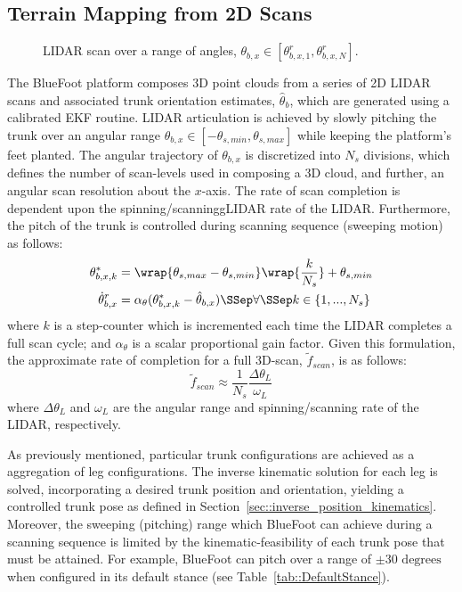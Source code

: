 		\subsection{Terrain Mapping from 2D Scans}
			\label{ssec::terrain_mapping}
			\begin{figure}[!h]
				\centering
				\caption{LIDAR scan over a range of angles, $\theta_{b,x} \in [\theta_{b,x,1}^{r},\theta_{b,x,N}^{r}]$. }
				\label{fig::sensor_sweep}
			\end{figure}
			The BlueFoot platform composes 3D point clouds from a series of 2D LIDAR scans and associated trunk orientation estimates, $\hat{\theta}_{b}$, which are generated using a calibrated EKF routine. LIDAR articulation is achieved by slowly pitching the trunk over an angular range $\theta_{b,x}\in[-\theta_{s,min},\theta_{s,max}]$ while keeping the platform's feet planted. The angular trajectory of $\theta_{b,x}$ is discretized into $N_{s}$ divisions, which defines the number of scan-levels used in composing a 3D cloud, and further, an angular scan resolution about the $x$-axis. The rate of scan completion is dependent upon the spinning/scanninggLIDAR rate of the LIDAR. Furthermore, the pitch of the trunk is controlled during scanning sequence (sweeping motion) as follows:
				\begin{equation}
					\begin{split}
					\theta_{b,x,k}^{*} &= 
						\wrap{\theta_{s,max}-\theta_{s,min}}
							\wrap{\frac{k}{N_{s}}} + 
								\theta_{s,min} \\
					\dot{\theta}_{b,x}^{r} &=
						\alpha_{\theta}
							(\theta_{b,x,k}^{*} - \hat{\theta}_{b,x} ) \SSep
							\forall \SSep k \in \{1,...,N_{s}\}
					\end{split}
				\end{equation}
			where $k$ is a step-counter which is incremented each time the LIDAR completes a full scan cycle; and $\alpha_{\theta}$ is a scalar proportional gain factor. Given this formulation, the approximate rate of completion for a full 3D-scan, $\tilde{f}_{scan}$, is as follows:
				\begin{equation}
					\tilde{f}_{scan}\approx\frac{1}{N_{s}}\frac{\Delta\theta_{L}}{\omega_{L}}
					\label{eq::point_cloud_collection_rate}
				\end{equation}
			where $\Delta\theta_{L}$ and $\omega_{L}$ are the angular range and spinning/scanning rate of the LIDAR, respectively.

			As previously mentioned, particular trunk configurations are achieved as a aggregation of leg configurations. The inverse kinematic solution for each leg is solved, incorporating a desired trunk position and orientation, yielding a controlled trunk pose as defined in Section~\ref{sec::inverse_position_kinematics}. Moreover, the sweeping (pitching) range which BlueFoot can achieve during a scanning sequence is limited by the kinematic-feasibility of each \Kth trunk pose that must be attained. For example, BlueFoot can pitch over a range of $\pm 30\text{ degrees}$ when configured in its default stance (see Table~\ref{tab::DefaultStance}).

